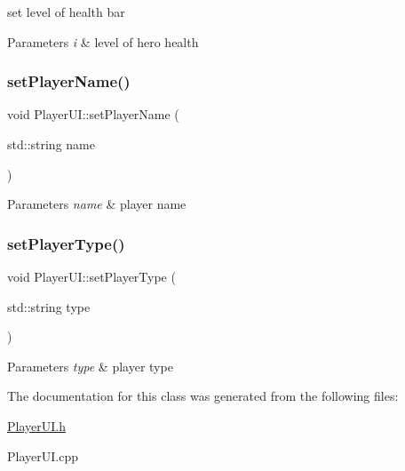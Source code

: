set level of health bar 


\begin{DoxyParams}{Parameters}
{\em i} & level of hero health \\
\hline
\end{DoxyParams}
\mbox{\label{class_player_u_i_ae89b4bc3d9337f7010c504f6dd89e473}} 
\subsubsection{\texorpdfstring{set\+Player\+Name()}{setPlayerName()}}
{\footnotesize\ttfamily void Player\+U\+I\+::set\+Player\+Name (\begin{DoxyParamCaption}\item[{std\+::string}]{name }\end{DoxyParamCaption})}


\begin{DoxyParams}{Parameters}
{\em name} & player name \\
\hline
\end{DoxyParams}
\mbox{\label{class_player_u_i_ab43462a4fd71580e29c06f6516f279b4}} 
\subsubsection{\texorpdfstring{set\+Player\+Type()}{setPlayerType()}}
{\footnotesize\ttfamily void Player\+U\+I\+::set\+Player\+Type (\begin{DoxyParamCaption}\item[{std\+::string}]{type }\end{DoxyParamCaption})}


\begin{DoxyParams}{Parameters}
{\em type} & player type \\
\hline
\end{DoxyParams}


The documentation for this class was generated from the following files\+:\begin{DoxyCompactItemize}
\item 
\hyperlink{_player_u_i_8h}{Player\+U\+I.\+h}\item 
Player\+U\+I.\+cpp\end{DoxyCompactItemize}
